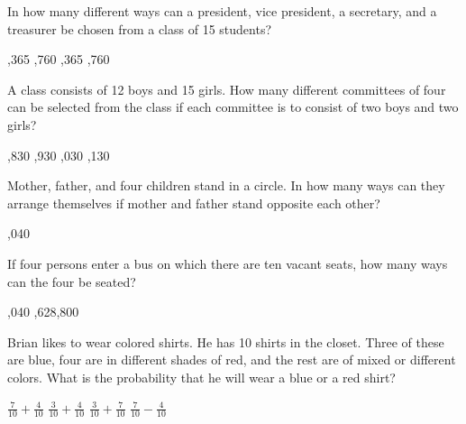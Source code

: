 \begin{questions}
\question In how many different ways can a president, vice president, a secretary, and a treasurer  be chosen from a class of 15 students? 
\begin{multicols}{4}
\begin{choices}  
,365
,760
,365
,760
\end{choices}
\end{multicols} 

\question A class consists of 12 boys and 15 girls. How many different committees of four can be selected from the class if each committee is to consist of two boys and two girls?
\begin{multicols}{4}
\begin{choices}  
,830
,930
,030
,130
\end{choices}
\end{multicols} 

\question Mother, father, and four children stand in a circle. In how many ways can they arrange themselves if mother and father stand opposite each other?
\begin{multicols}{4}
\begin{choices} 
,040
\end{choices}
\end{multicols} 

\question If four persons enter a bus on which there are ten vacant seats, how many ways  can the four be seated?
\begin{multicols}{4}
\begin{choices}  
,040
,628,800
\end{choices}
\end{multicols} 

\question Brian likes to wear colored shirts. He has 10 shirts in the closet. Three of these are blue, four are in different shades of red, and the rest are of mixed or different colors. What is the probability that he will wear a blue or a red shirt? 
\begin{multicols}{4}
\begin{choices} 
\choice $\displaystyle \frac{7}{10} + \frac{4}{10}$
\CorrectChoice $\displaystyle \frac{3}{10} + \frac{4}{10}$
\choice $\displaystyle \frac{3}{10} + \frac{7}{10}$ 
\choice $\displaystyle \frac{7}{10} - \frac{4}{10}$ 
\end{choices}
\end{multicols}


\end{questions}
